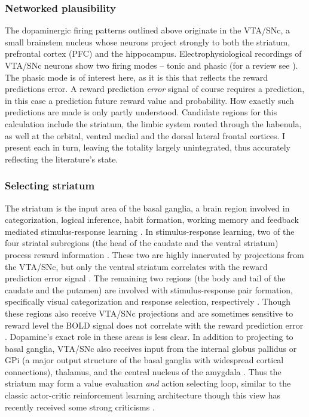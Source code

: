 \documentclass[doc,12pt]{apa}        %
\begin{document}
\subsubsection{Networked plausibility}
\label{subsub:plausibility}
The dopaminergic firing patterns outlined above originate in the VTA/SNc, a small brainstem nucleus whose neurons project strongly to both the striatum, prefrontal cortex (PFC) and the hippocampus.  Electrophysiological recordings of VTA/SNc neurons show two firing modes -- tonic and phasic (for a review see ).  The phasic mode is of interest here, as it is this that reflects the reward predictions error.  A reward prediction \emph{error} signal of course requires a prediction, in this case a prediction future reward value and probability.  How exactly such predictions are made is only partly understood.  Candidate regions for this calculation include the striatum, the limbic system routed through the habenula, as well at the orbital, ventral medial and the dorsal lateral frontal cortices.  I present each in turn, leaving the totality largely unintegrated, thus accurately reflecting the literature's state.

\subsubsection{Selecting striatum}
\label{subsub:selstr}
The striatum is the input area of the basal ganglia, a brain region involved in categorization, logical inference, habit formation, working memory and feedback mediated stimulus-response learning \cite{Frank:2001p1996,Jin:2010p7199,SchmitzerTorbert:2004p5410,Seger:2008p6401,Seger:2010p7189,Yin:2006p5080}.  In stimulus-response learning, two of the four striatal subregions (the head of the caudate and the ventral striatum) process reward information \cite{Yin:2005p5101,Yin:2008p6347,Schonberg:2009p6669}.  These two are highly innervated by projections from the VTA/SNc, but only the ventral striatum correlates with the reward prediction error signal \cite{Haruno:2006p3979,Seger:2010p7189}.  The remaining two regions (the body and tail of the caudate and the putamen) are involved with stimulus-response pair formation, specifically visual categorization and response selection, respectively \cite{Seger:2008p6401,Seger:2010p7189}.  Though these regions also receive VTA/SNc projections and are sometimes sensitive to reward level \cite{BischoffGrethe:2009p4570} the BOLD signal does not correlate with the reward prediction error \cite{Seger:2010p7189}.  Dopamine's exact role in these areas is less clear.  In addition to projecting to basal ganglia, VTA/SNc also receives input from the internal globus pallidus or GPi (a major output structure of the basal ganglia with widespread cortical connections), thalamus, and the central nucleus of the amygdala \cite{Botvinick:2008p6594}.   Thus the striatum may form a value evaluation \emph{and} action selecting loop, similar to the classic actor-critic reinforcement learning architecture \cite{Bornstein:2011p7996,Ito:2011p8146} though this view has recently received some strong criticisms \cite{Joel:2002p6593}.
\end{document}

